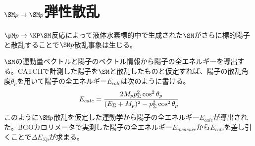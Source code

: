 \section{$\SM p\rightarrow \SM p$弾性散乱}
$\pM p\rightarrow \KP\SM$反応によって液体水素標的中で生成された$\SM$がさらに標的陽子と散乱することで$\SM p$散乱事象は生じる。\par
$\SM$の運動量ベクトルと陽子のベクトル情報から陽子の全エネルギーを導出する。CATCHで計測した陽子を$\SM$と散乱したものと仮定すれば、陽子の散乱角度$\theta_{p}$を用いて陽子の全エネルギー$E_{calc}$は次のように書ける。
\begin{equation}
E_{calc} = \cfrac{2M_{p}p^2_{\Sigma}\cos^2\theta_{p}}{(E_{\Sigma}+M_{p})^{2}-p^2_{\Sigma}\cos^2\theta_{p}}
\end{equation}
このように$\SM p$散乱を仮定した運動学から陽子の全エネルギー$E_{calc}$が導出された。BGOカロリメータで実測した陽子の全エネルギー$E_{measure}$から$E_{calc}$を差し引くことで$\Delta E_{\Sigma p}$が求まる。\par

